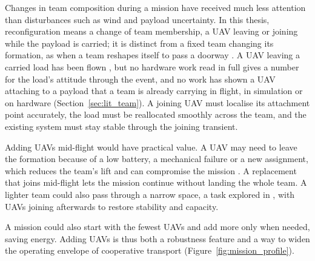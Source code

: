 Changes in team composition during a mission have received much less attention than disturbances such as wind and payload uncertainty. In this thesis, reconfiguration means a change of team membership, a UAV leaving or joining while the payload is carried; it is distinct from a fixed team changing its formation, as when a team reshapes itself to pass a doorway \cite{jackson2020scalable}. A UAV leaving a carried load has been flown \cite{quan2025swarm, zeng2025marl}, but no hardware work read in full gives a number for the load's attitude through the event, and no work has shown a UAV attaching to a payload that a team is already carrying in flight, in simulation or on hardware (Section~\ref{sec:lit_team}). A joining UAV must localise its attachment point accurately, the load must be reallocated smoothly across the team, and the existing system must stay stable through the joining transient.

Adding UAVs mid-flight would have practical value. A UAV may need to leave the formation because of a low battery, a mechanical failure or a new assignment, which reduces the team's lift and can compromise the mission \cite{farrasFaultTolerantControlMultiQuadcopter2024}. A replacement that joins mid-flight lets the mission continue without landing the whole team. A lighter team could also pass through a narrow space, a task explored in \cite{tudelft, tensionbased}, with UAVs joining afterwards to restore stability and capacity.

A mission could also start with the fewest UAVs and add more only when needed, saving energy. Adding UAVs is thus both a robustness feature and a way to widen the operating envelope of cooperative transport (Figure~\ref{fig:mission_profile}).



